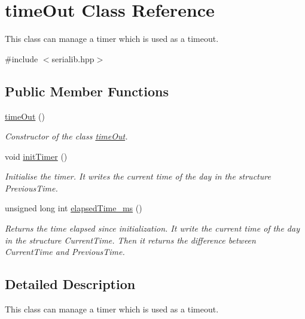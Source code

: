 \hypertarget{classtimeOut}{}\section{time\+Out Class Reference}
\label{classtimeOut}


This class can manage a timer which is used as a timeout.  




{\ttfamily \#include $<$serialib.\+hpp$>$}

\subsection*{Public Member Functions}
\begin{DoxyCompactItemize}
\item 
\mbox{\label{classtimeOut_a2cffa89f7b90e4501e07e8cb7ccb3117}} 
\hyperlink{classtimeOut_a2cffa89f7b90e4501e07e8cb7ccb3117}{time\+Out} ()
\begin{DoxyCompactList}\small\item\em Constructor of the class \hyperlink{classtimeOut}{time\+Out}. \end{DoxyCompactList}\item 
\mbox{\label{classtimeOut_a88b4caef4ce7bfc42b73a61589c098e8}} 
void \hyperlink{classtimeOut_a88b4caef4ce7bfc42b73a61589c098e8}{init\+Timer} ()
\begin{DoxyCompactList}\small\item\em Initialise the timer. It writes the current time of the day in the structure Previous\+Time. \end{DoxyCompactList}\item 
unsigned long int \hyperlink{classtimeOut_af5db5b5f0db4f6ada19187ef8f214214}{elapsed\+Time\+\_\+ms} ()
\begin{DoxyCompactList}\small\item\em Returns the time elapsed since initialization. It write the current time of the day in the structure Current\+Time. Then it returns the difference between Current\+Time and Previous\+Time. \end{DoxyCompactList}\end{DoxyCompactItemize}


\subsection{Detailed Description}
This class can manage a timer which is used as a timeout. 

